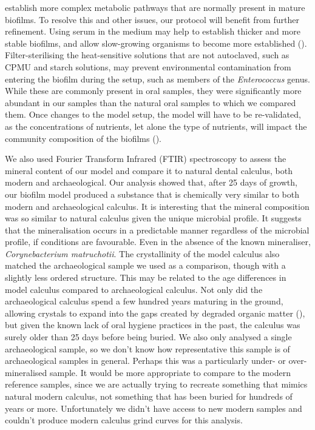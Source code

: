 \documentclass[
  b5paper,
]{book}
\begin{document}
establish more complex metabolic pathways that are normally present in
mature biofilms. To resolve this and other issues, our protocol will
benefit from further refinement. Using serum in the medium may help to
establish thicker and more stable biofilms, and allow slow-growing
organisms to become more established
().
Filter-sterilising the heat-sensitive solutions that are not autoclaved,
such as CPMU and starch solutions, may prevent environmental
contamination from entering the biofilm during the setup, such as
members of the \emph{Enterococcus} genus. While these are commonly
present in oral samples, they were significantly more abundant in our
samples than the natural oral samples to which we compared them. Once
changes to the model setup, the model will have to be re-validated, as
the concentrations of nutrients, let alone the type of nutrients, will
impact the community composition of the biofilms
().

We also used Fourier Transform Infrared (FTIR) spectroscopy to assess
the mineral content of our model and compare it to natural dental
calculus, both modern and archaeological. Our analysis showed that,
after 25 days of growth, our biofilm model produced a substance that is
chemically very similar to both modern and archaeological calculus. It
is interesting that the mineral composition was so similar to natural
calculus given the unique microbial profile. It suggests that the
mineralisation occurs in a predictable manner regardless of the
microbial profile, if conditions are favourable. Even in the absence of
the known mineraliser, \emph{Corynebacterium matruchotii}. The
crystallinity of the model calculus also matched the archaeological
sample we used as a comparison, though with a slightly less ordered
structure. This may be related to the age differences in model calculus
compared to archaeological calculus. Not only did the archaeological
calculus spend a few hundred years maturing in the ground, allowing
crystals to expand into the gaps created by degraded organic matter
(), but given
the known lack of oral hygiene practices in the past, the calculus was
surely older than 25 days before being buried. We also only analysed a
single archaeological sample, so we don't know how representative this
sample is of archaeological samples in general. Perhaps this was a
particularly under- or over-mineralised sample. It would be more
appropriate to compare to the modern reference samples, since we are
actually trying to recreate something that mimics natural modern
calculus, not something that has been buried for hundreds of years or
more. Unfortunately we didn't have access to new modern samples and
couldn't produce modern calculus grind curves for this analysis.
\end{document}
